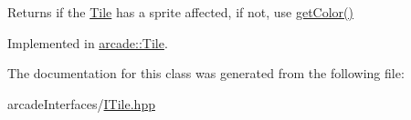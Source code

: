 Returns if the \hyperlink{classarcade_1_1_tile}{Tile} has a sprite affected, if not, use \hyperlink{classarcade_1_1_i_tile_adb20cb553bc2ce17dc23125eb70b8329}{get\+Color()} 



Implemented in \hyperlink{classarcade_1_1_tile_abb9bfea961e713a36213627d0787aae2}{arcade\+::\+Tile}.



The documentation for this class was generated from the following file\+:\begin{DoxyCompactItemize}
\item 
arcade\+Interfaces/\hyperlink{_i_tile_8hpp}{I\+Tile.\+hpp}\end{DoxyCompactItemize}
